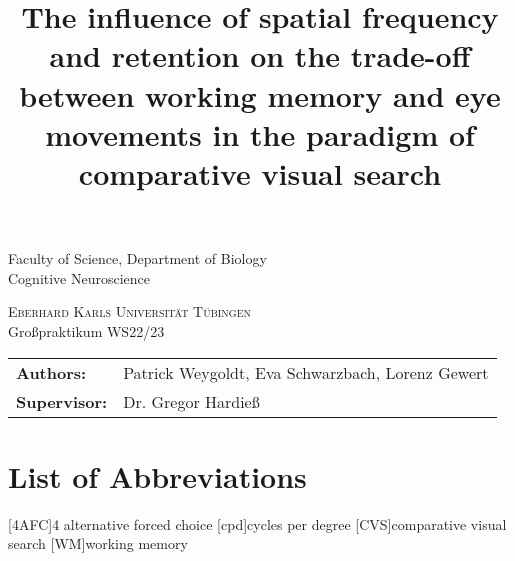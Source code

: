 \documentclass[12pt,a4paper]{article}
\newcommand{\HRule}[1]{\rule{\linewidth}{#1}} %
\begin{document}
\title{	\normalsize 
			\LARGE \textbf{The influence of spatial frequency and retention on the trade-off between working memory and eye movements in the paradigm of comparative visual search}
            \\ [0.5cm]		%
			\large \thedate			%
		}


\makeatletter
\let\thetitle\@title
\let\theauthor\@author
\let\thedate\@date
\makeatother
\begin{titlepage}

Faculty of Science, Department of Biology\\
Cognitive Neuroscience
  \begin{center}
  \vspace*{5cm}
    {\Large \bf \thetitle}
    
    \vspace*{4cm}
    \large
    \textsc{Eberhard Karls Universit\"at T\"ubingen}\\
    Großpraktikum WS22/23

    \vfill
 \end{center}
    \begin{minipage}{0.9\textwidth}
    \begin{tabular}{@{}ll}

      \large\bf Authors: & \large Patrick Weygoldt, Eva Schwarzbach, Lorenz Gewert\\
      \large\bf Supervisor: & \large Dr. Gregor Hardieß
    \end{tabular}
  \end{minipage}
  

  \vspace*{2cm}

\end{titlepage}


%

\newpage
\tableofcontents
\newpage
\listoffigures
\section*{List of Abbreviations}
\begin{acronym}[4AFC] %
\setlength{\itemsep}{-0.1\parsep}
\acro{}[4AFC]{4 alternative forced choice}
\acro{}[cpd]{cycles per degree}
\acro{}[CVS]{comparative visual search}
\acro{}[WM]{working memory}

\end{acronym}


\newpage









\newpage
\pagebreak
\printbibliography 
%
\end{document}
